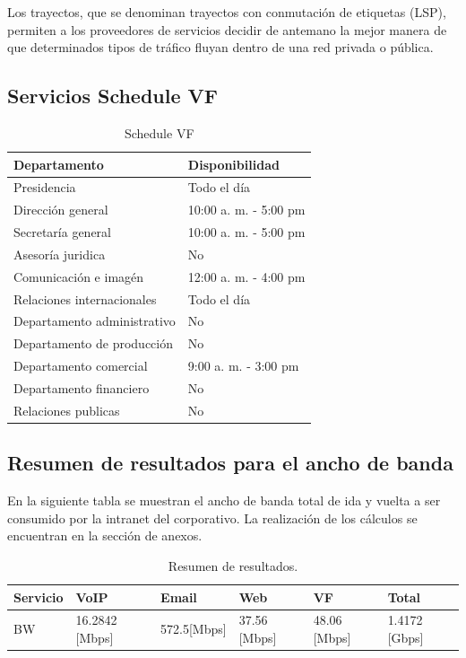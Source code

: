 \documentclass[12pt,letterpaper]{article}
\begin{document}
Los trayectos, que se denominan trayectos con conmutación de etiquetas (LSP), 
permiten a los proveedores de servicios decidir de antemano la mejor manera de 
que determinados tipos de tráfico fluyan dentro de una red privada o pública. \cite{mpls}

\newpage
\subsection{Servicios Schedule VF}
\begin{table}[ht]
    \centering
    \begin{tabular}{|l|l|}
    \hline
    Departamento & Disponibilidad \\ \hline
    Presidencia & Todo el día \\ \hline
    Dirección general & 10:00 a. m. - 5:00 pm \\ \hline
    Secretaría general & 10:00 a. m. - 5:00 pm \\ \hline
    Asesoría juridica & No \\ \hline
    Comunicación e imagén & 12:00 a. m. - 4:00 pm \\ \hline
    Relaciones internacionales & Todo el día \\ \hline
    Departamento administrativo & No \\ \hline
    Departamento de producción & No \\ \hline
    Departamento comercial & 9:00 a. m. - 3:00 pm \\ \hline
    Departamento financiero & No \\ \hline
    Relaciones publicas & No \\ \hline
    \end{tabular}
    \caption{Schedule VF}
    \label{my-label}
\end{table}

\subsection{Resumen de resultados para el ancho de banda}
En la siguiente tabla se muestran el ancho de banda total de ida y vuelta a ser consumido por 
la intranet del corporativo. La realización de los cálculos se encuentran en la sección de 
anexos.
\begin{table}[ht]
    \centering
    \begin{tabular}{|l|l|l|l|l|l|}
    \hline
    Servicio & VoIP & Email & Web & VF & Total \\ \hline
    BW & 16.2842 [Mbps] & 572.5[Mbps] & 37.56 [Mbps] & 48.06 [Mbps] & 1.4172 [Gbps] \\ \hline
    \end{tabular}
    \caption{Resumen de resultados.}
    \label{my-label}
\end{table}
\end{document}
